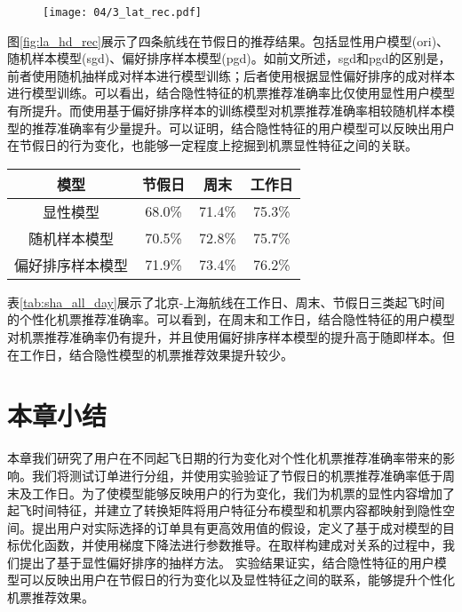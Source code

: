 \begin{figure}
 \centering
 \texttt{[image: 04/3\_lat\_rec.pdf]}
\end{figure}

图\ref{fig:la_hd_rec}展示了四条航线在节假日的推荐结果。包括显性用户模型(ori)、随机样本模型(sgd)、偏好排序样本模型(pgd)。如前文所述，sgd和pgd的区别是，前者使用随机抽样成对样本进行模型训练；后者使用根据显性偏好排序的成对样本进行模型训练。可以看出，结合隐性特征的机票推荐准确率比仅使用显性用户模型有所提升。而使用基于偏好排序样本的训练模型对机票推荐准确率相较随机样本模型的推荐准确率有少量提升。可以证明，结合隐性特征的用户模型可以反映出用户在节假日的行为变化，也能够一定程度上挖掘到机票显性特征之间的关联。


\begin{table}[!h]
  \centering
  \begin{tabular}{|c|c|c|c|} \hline 
模型 & 节假日 & 周末 & 工作日 \\ \hline
显性模型 & 68.0\% & 71.4\% & 75.3\% \\ \hline
随机样本模型 & 70.5\% & 72.8\% & 75.7\% \\ \hline
偏好排序样本模型 & 71.9\% & 73.4\% & 76.2\% \\ \hline
  \end{tabular}
\end{table}

表\ref{tab:sha_all_day}展示了北京-上海航线在工作日、周末、节假日三类起飞时间的个性化机票推荐准确率。可以看到，在周末和工作日，结合隐性特征的用户模型对机票推荐准确率仍有提升，并且使用偏好排序样本模型的提升高于随即样本。但在工作日，结合隐性模型的机票推荐效果提升较少。

\section{本章小结}

本章我们研究了用户在不同起飞日期的行为变化对个性化机票推荐准确率带来的影响。我们将测试订单进行分组，并使用实验验证了节假日的机票推荐准确率低于周末及工作日。为了使模型能够反映用户的行为变化，我们为机票的显性内容增加了起飞时间特征，并建立了转换矩阵将用户特征分布模型和机票内容都映射到隐性空间。提出用户对实际选择的订单具有更高效用值的假设，定义了基于成对模型的目标优化函数，并使用梯度下降法进行参数推导。在取样构建成对关系的过程中，我们提出了基于显性偏好排序的抽样方法。
实验结果证实，结合隐性特征的用户模型可以反映出用户在节假日的行为变化以及显性特征之间的联系，能够提升个性化机票推荐效果。